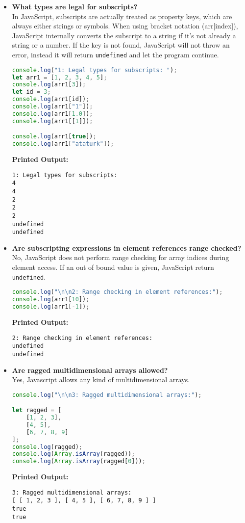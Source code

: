 \documentclass{article}
\begin{document}
\begin{itemize}
\item \textbf{What types are legal for subscripts?} \\
In JavaScript, subscripts are actually treated as property keys, which are always either strings or symbols. When using bracket notation (arr[index]), JavaScript internally converts the subscript to a string if it's not already a string or a number. If the key is not found, JavaScript will not throw an error, instead it will return \texttt{undefined} and let the program continue.
\begin{lstlisting}[language=JavaScript]
console.log("1: Legal types for subscripts: ");
let arr1 = [1, 2, 3, 4, 5];
console.log(arr1[3]);
let id = 3;
console.log(arr1[id]);
console.log(arr1["1"]);
console.log(arr1[1.0]);
console.log(arr1[[1]]);

console.log(arr1[true]); 
console.log(arr1["ataturk"]);
\end{lstlisting}
\textbf{Printed Output:}
\begin{verbatim}
1: Legal types for subscripts: 
4
4
2
2
2
undefined
undefined
\end{verbatim}


\item \textbf{Are subscripting expressions in element references range checked?} \\
No, JavaScript does not perform range checking for array indices during element access. If an out of bound value is given, JavaScript return \texttt{undefined}.
\begin{lstlisting}[language=JavaScript]
console.log("\n\n2: Range checking in element references:");
console.log(arr1[10]);
console.log(arr1[-1]);
\end{lstlisting}
\textbf{Printed Output:}
\begin{verbatim}
2: Range checking in element references:
undefined
undefined
\end{verbatim}


\item \textbf{Are ragged multidimensional arrays allowed?} \\
Yes, Javascript allows any kind of multidimensional arrays.
\begin{lstlisting}[language=JavaScript]
console.log("\n\n3: Ragged multidimensional arrays:");

let ragged = [
    [1, 2, 3],
    [4, 5],
    [6, 7, 8, 9]
];
console.log(ragged);
console.log(Array.isArray(ragged));
console.log(Array.isArray(ragged[0]));
\end{lstlisting}
\textbf{Printed Output:}
\begin{verbatim}
3: Ragged multidimensional arrays:
[ [ 1, 2, 3 ], [ 4, 5 ], [ 6, 7, 8, 9 ] ]
true
true
\end{verbatim}



\end{itemize}
\end{document}
